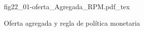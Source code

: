 \begin{figure}[h]
\centering
\def\svgwidth{0.5\textwidth}
{fig22_01-oferta_Agregada_RPM.pdf_tex}
\caption{Oferta agregada y regla de política monetaria}
\label{fig22_01-oferta_Agregada_RPM}
\end{figure}